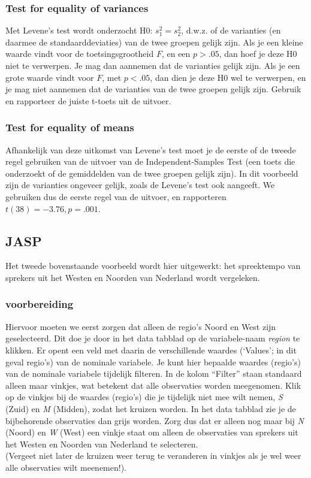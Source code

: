 \documentclass[
]{book}
\begin{document}
\subsubsection{Test for equality of variances}\label{test-for-equality-of-variances}

Met Levene's test wordt onderzocht H0: \(s^2_1 = s^2_2\), d.w.z. of de
varianties (en daarmee de standaarddeviaties) van de twee groepen gelijk
zijn. Als je een kleine waarde vindt voor de toetsingsgrootheid \(F\), en
een \(p>.05\), dan hoef je deze H0 niet te verwerpen. Je mag dan aannemen
dat de varianties gelijk zijn. Als je een grote waarde vindt voor \(F\),
met \(p<.05\), dan dien je deze H0 wel te verwerpen, en je mag niet
aannemen dat de varianties van de twee groepen gelijk zijn. Gebruik en
rapporteer de juiste t-toets uit de uitvoer.

\subsubsection{Test for equality of means}\label{test-for-equality-of-means}

Afhankelijk van deze uitkomst van Levene's test moet je de eerste of de
tweede regel gebruiken van de uitvoer van de Independent-Samples Test
(een toets die onderzoekt of de gemiddelden van de twee groepen gelijk
zijn). In dit voorbeeld zijn de varianties ongeveer gelijk, zoals de
Levene's test ook aangeeft. We gebruiken dus de eerste regel van de
uitvoer, en rapporteren \(t(38)=-3.76, p=.001\).

\subsection{JASP}\label{sec:jaspttoetsongepaard}

Het tweede bovenstaande voorbeeld wordt hier uitgewerkt: het spreektempo
van sprekers uit het Westen en Noorden van Nederland wordt vergeleken.

\subsubsection{voorbereiding}\label{voorbereiding}

Hiervoor moeten we eerst zorgen dat alleen de regio's Noord en West zijn
geselecteerd. Dit doe je door in het data tabblad op de variabele-naam
\emph{region} te klikken. Er opent een veld met daarin de verschillende
waardes (`Values'; in dit geval regio's) van de nominale variabele. Je
kunt hier bepaalde waardes (regio's) van de nominale variabele tijdelijk
filteren. In de kolom ``Filter'' staan standaard alleen maar vinkjes, wat
betekent dat alle observaties worden meegenomen. Klik op de vinkjes bij
de waardes (regio's) die je tijdelijk niet mee wilt nemen, \emph{S} (Zuid) en
\emph{M} (Midden), zodat het kruizen worden. In het data tabblad zie je de
bijbehorende observaties dan grijs worden. Zorg dus dat er alleen nog
maar bij \emph{N} (Noord) en \emph{W} (West) een vinkje staat om alleen de
observaties van sprekers uit het Westen en Noorden van Nederland te
selecteren.\\
(Vergeet niet later de kruizen weer terug te veranderen in vinkjes als
je wel weer alle observaties wilt meenemen!).
\end{document}
